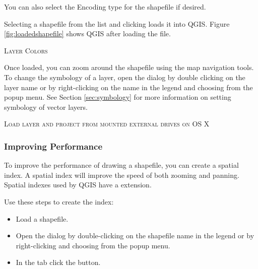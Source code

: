 You can also select the Encoding type for the shapefile if desired.

Selecting a shapefile from the list and clicking  loads it into QGIS. Figure
\ref{fig:loadedshapefile} shows QGIS after loading the  file.


\begin{Tip}\caption{\textsc{Layer Colors}}
\end{Tip}

Once loaded, you can zoom around the shapefile using the map navigation tools.
To change the symbology of a layer, open the  dialog by double
clicking on the layer name or by right-clicking on the name in the legend and
choosing  from the popup menu. See
Section \ref{sec:symbology} for more information on setting symbology of
vector layers.
 
\begin{Tip}\caption{\textsc{Load layer and project from mounted external
drives on OS X}}
\end{Tip}
 
\subsubsection{Improving Performance}

To improve the performance of drawing a shapefile, you can create a spatial
index. A  spatial index will improve the 
speed of both zooming and panning. Spatial indexes used by QGIS have a 
 extension.

Use these steps to create the index:

\begin{itemize}
\item Load a shapefile.
\item Open the  dialog by double-clicking on the
shapefile name in the legend or by right-clicking and choosing
 from the popup menu.
\item In the tab  click the  button.
\end{itemize}


